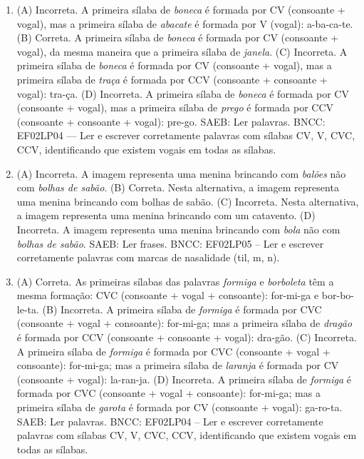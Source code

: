 
\begin{enumerate}
\item
(A) Incorreta. A primeira sílaba de \textit{boneca} é formada por CV 
(consoante + vogal), mas a primeira sílaba de \textit{abacate} é formada
por V (vogal): a-ba-ca-te.
(B) Correta. A primeira sílaba de \textit{boneca} é formada por CV 
(consoante + vogal), da mesma maneira que a primeira sílaba de 
\textit{janela}. 
(C) Incorreta. A primeira sílaba de \textit{boneca} é formada por CV 
(consoante + vogal), mas a primeira sílaba de \textit{traça} é formada
por CCV (consoante + consoante + vogal): tra-ça.
(D) Incorreta. A primeira sílaba de \textit{boneca} é formada por CV 
(consoante + vogal), mas a primeira sílaba de \textit{prego} é formada
por CCV (consoante + consoante + vogal): pre-go.
SAEB: Ler palavras.
BNCC: EF02LP04 --- Ler e escrever corretamente palavras com
sílabas CV, V, CVC, CCV, identificando que existem vogais em todas as
sílabas.

\item
(A) Incorreta. A imagem representa uma menina brincando com \textit{balões}
não com \textit{bolhas de sabão}.
(B) Correta. Nesta alternativa, a imagem representa uma menina brincando
com bolhas de sabão.
(C) Incorreta. Nesta alternativa, a imagem representa uma menina brincando
com um catavento.
(D) Incorreta. A imagem representa uma menina brincando com \textit{bola}
não com \textit{bolhas de sabão}.
SAEB: Ler frases.
BNCC: EF02LP05 -- Ler e escrever corretamente palavras com marcas de
nasalidade (til, m, n).

\item
(A) Correta. As primeiras sílabas das palavras \textit{formiga} e 
\textit{borboleta} têm a mesma formação: CVC (consoante + vogal + 
consoante): for-mi-ga e bor-bo-le-ta.   
(B) Incorreta. A primeira sílaba de \textit{formiga} é formada
por CVC (consoante + vogal + consoante): for-mi-ga; mas a primeira 
sílaba de \textit{dragão} é formada por CCV (consoante + consoante + 
vogal): dra-gão.
(C) Incorreta. A primeira sílaba de \textit{formiga} é formada
por CVC (consoante + vogal + consoante): for-mi-ga; mas a primeira 
sílaba de \textit{laranja} é formada por CV (consoante + vogal): 
la-ran-ja.
(D) Incorreta. A primeira sílaba de \textit{formiga} é formada
por CVC (consoante + vogal + consoante): for-mi-ga; mas a primeira 
sílaba de \textit{garota} é formada por CV (consoante + vogal): 
ga-ro-ta.
SAEB: Ler palavras.
BNCC: EF02LP04 -- Ler e escrever corretamente palavras com
sílabas CV, V, CVC, CCV, identificando que existem vogais em todas as
sílabas.
\end{enumerate}

